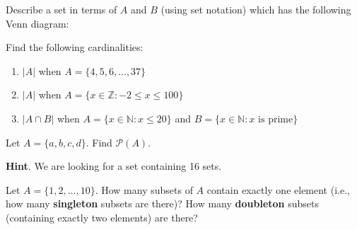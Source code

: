 \documentclass[10pt,]{book}
\newcommand{\terminology}[1]{\textbf{#1}}
\theoremstyle{plain}
\theoremstyle{definition}
\theoremstyle{definition}
\theoremstyle{definition}
\theoremstyle{definition}
\numberwithin{equation}{chapter}
\def\N{\mathbb N}
\def\Z{\mathbb Z}
\def\pow{\mathcal P}
\def\st{:}
\begin{document}
\begin{divisionexercise}{8}\hypertarget{exercise-194}{}
\hypertarget{p-1570}{}%
Describe a set in terms of \(A\) and \(B\) (using set notation) which has the following Venn diagram:%
\begin{sidebyside}{1}{0.4}{0.4}{0}
\begin{sbspanel}{0.2}
\end{sbspanel}
\end{sidebyside}
\end{divisionexercise}%
\begin{divisionexercise}{9}\hypertarget{exercise-195}{}
\hypertarget{p-1571}{}%
Find the following cardinalities: \leavevmode%
\begin{enumerate}[label=(\alph*)]
\item\hypertarget{li-520}{}\(|A|\) when \(A = \{4,5,6,\ldots,37\}\)%
\item\hypertarget{li-521}{}\(|A|\) when \(A = \{x \in \Z \st -2 \le x \le 100\}\)%
\item\hypertarget{li-522}{}\(|A \cap B|\) when \(A = \{x \in \N \st x \le 20\}\) and \(B = \{x \in \N \st x \mbox{ is prime} \}\)%
\end{enumerate}
%
\end{divisionexercise}%
\begin{divisionexercise}{10}\hypertarget{exercise-196}{}
\hypertarget{p-1576}{}%
Let \(A = \{a, b, c, d\}\). Find \(\pow(A)\).%
\par\smallskip%
\noindent\textbf{Hint}.\hypertarget{hint-69}{}\quad%
\hypertarget{p-1577}{}%
We are looking for a set containing 16 sets.%
\end{divisionexercise}%
\begin{divisionexercise}{11}\hypertarget{exercise-197}{}
\hypertarget{p-1578}{}%
Let \(A = \{1,2,\ldots, 10\}\). How many subsets of \(A\) contain exactly one element (i.e., how many \terminology{singleton} subsets are there)? How many \terminology{doubleton} subsets (containing exactly two elements) are there?%
\end{divisionexercise}%
\end{document}
